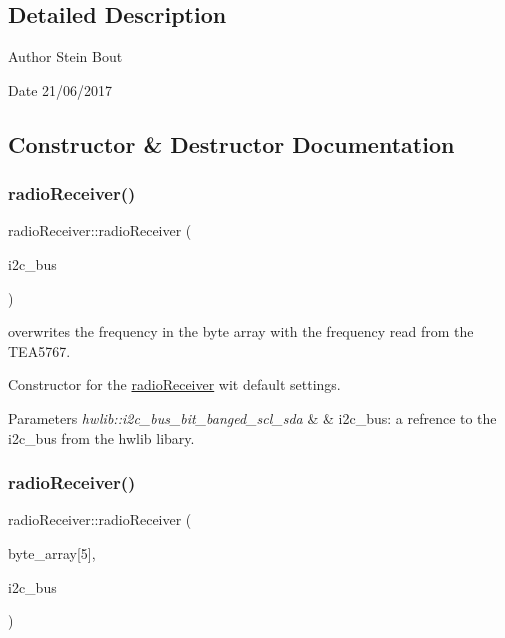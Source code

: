 \subsection{Detailed Description}
\begin{DoxyAuthor}{Author}
Stein Bout 
\end{DoxyAuthor}
\begin{DoxyDate}{Date}
21/06/2017 
\end{DoxyDate}


\subsection{Constructor \& Destructor Documentation}
\mbox{\label{classradio_receiver_ad40aeb52139ece882e24191e1ac6590e}} 
\subsubsection{\texorpdfstring{radio\+Receiver()}{radioReceiver()}\hspace{0.1cm}{\footnotesize\ttfamily [1/2]}}
{\footnotesize\ttfamily radio\+Receiver\+::radio\+Receiver (\begin{DoxyParamCaption}\item[{hwlib\+::i2c\+\_\+bus\+\_\+bit\+\_\+banged\+\_\+scl\+\_\+sda \&}]{i2c\+\_\+bus }\end{DoxyParamCaption})}



overwrites the frequency in the byte array with the frequency read from the T\+E\+A5767. 

Constructor for the \hyperlink{classradio_receiver}{radio\+Receiver} wit default settings. 
\begin{DoxyParams}{Parameters}
{\em hwlib\+::i2c\+\_\+bus\+\_\+bit\+\_\+banged\+\_\+scl\+\_\+sda} & \& i2c\+\_\+bus\+: a refrence to the i2c\+\_\+bus from the hwlib libary. \\
\hline
\end{DoxyParams}
\mbox{\label{classradio_receiver_a33dafbceb153032b6250077c273bd844}} 
\subsubsection{\texorpdfstring{radio\+Receiver()}{radioReceiver()}\hspace{0.1cm}{\footnotesize\ttfamily [2/2]}}
{\footnotesize\ttfamily radio\+Receiver\+::radio\+Receiver (\begin{DoxyParamCaption}\item[{char}]{byte\+\_\+array\mbox{[}5\mbox{]},  }\item[{hwlib\+::i2c\+\_\+bus\+\_\+bit\+\_\+banged\+\_\+scl\+\_\+sda \&}]{i2c\+\_\+bus }\end{DoxyParamCaption})}



